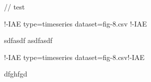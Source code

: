 // test

!-IAE type=timeseries dataset=fig-8.csv !-IAE

sdfasdf
asdfasdf


!-IAE type=timeseries dataset=fig-8.csv!-IAE

dfghfgd
